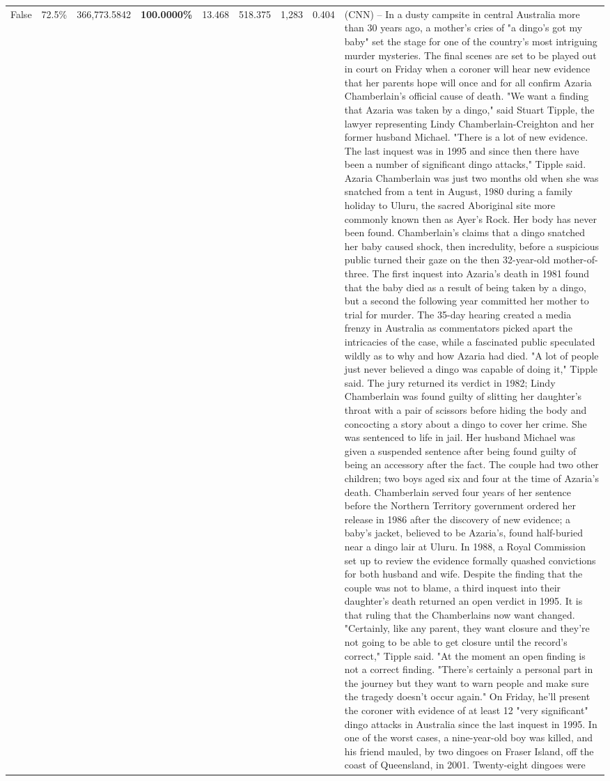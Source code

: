 \begin{table}[H]
\begin{tabular}{lllrlllll}
False & 72.5\% & 366,773.5842 & \bfseries \color{red} 100.0000\% & 13.468 & 518.375 & 1,283 & 0.404 & (CNN) -- In a dusty campsite in central Australia more than 30 years ago, a mother's cries of "a dingo's got my baby" set the stage for one of the country's most intriguing murder mysteries. The final scenes are set to be played out in court on Friday when a coroner will hear new evidence that her parents hope will once and for all confirm Azaria Chamberlain's official cause of death. "We want a finding that Azaria was taken by a dingo," said Stuart Tipple, the lawyer representing Lindy Chamberlain-Creighton and her former husband Michael. "There is a lot of new evidence. The last inquest was in 1995 and since then there have been a number of significant dingo attacks," Tipple said. Azaria Chamberlain was just two months old when she was snatched from a tent in August, 1980 during a family holiday to Uluru, the sacred Aboriginal site more commonly known then as Ayer's Rock. Her body has never been found. Chamberlain's claims that a dingo snatched her baby caused shock, then incredulity, before a suspicious public turned their gaze on the then 32-year-old mother-of-three. The first inquest into Azaria's death in 1981 found that the baby died as a result of being taken by a dingo, but a second the following year committed her mother to trial for murder. The 35-day hearing created a media frenzy in Australia as commentators picked apart the intricacies of the case, while a fascinated public speculated wildly as to why and how Azaria had died. "A lot of people just never believed a dingo was capable of doing it," Tipple said. The jury returned its verdict in 1982; Lindy Chamberlain was found guilty of slitting her daughter's throat with a pair of scissors before hiding the body and concocting a story about a dingo to cover her crime. She was sentenced to life in jail. Her husband Michael was given a suspended sentence after being found guilty of being an accessory after the fact. The couple had two other children; two boys aged six and four at the time of Azaria's death. Chamberlain served four years of her sentence before the Northern Territory government ordered her release in 1986 after the discovery of new evidence; a baby's jacket, believed to be Azaria's, found half-buried near a dingo lair at Uluru. In 1988, a Royal Commission set up to review the evidence formally quashed convictions for both husband and wife. Despite the finding that the couple was not to blame, a third inquest into their daughter's death returned an open verdict in 1995. It is that ruling that the Chamberlains now want changed. "Certainly, like any parent, they want closure and they're not going to be able to get closure until the record's correct," Tipple said. "At the moment an open finding is not a correct finding. "There's certainly a personal part in the journey but they want to warn people and make sure the tragedy doesn't occur again." On Friday, he'll present the coroner with evidence of at least 12 "very significant" dingo attacks in Australia since the last inquest in 1995. In one of the worst cases, a nine-year-old boy was killed, and his friend mauled, by two dingoes on Fraser Island, off the coast of Queensland, in 2001. Twenty-eight dingoes were 
\end{tabular}
\end{table}
